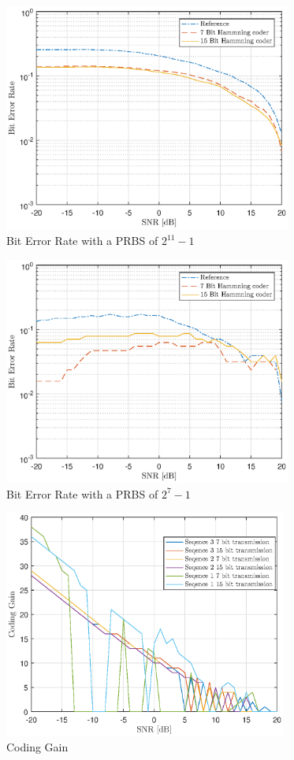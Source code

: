 \documentclass[12pt]{article}
\begin{document}
\begin{enumerate}
\begin{figure}[H]
    \centering
    \includegraphics[height=7.5cm]{PlotSeq2.eps}
    \caption{Bit Error Rate with a PRBS of $2^{11} -1 $}
    \label{fig:seq2}
\end{figure}

\begin{figure}[H]
    \centering
    \includegraphics[height=7.5cm]{PlotSeq1.eps}
    \caption{Bit Error Rate with a PRBS of $2^{7} -1 $}
    \label{fig:seq2}
\end{figure}

\begin{figure}[H]
    \centering
    \includegraphics[height=7.5cm]{Gain.eps}
    \caption{Coding Gain}
    \label{fig:seq2}
\end{figure}


\end{enumerate}
\end{document}
